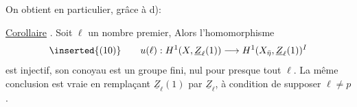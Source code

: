 On obtient en particulier\unsure{*}, grâce à d): 

\uline{Corollaire} .  Soit $\ell$ un nombre premier,  Alors l'homomorphisme
\[
\inserted{(10)}\qquad u(\ell):H^1(X,\underline Z_\ell(1))\longrightarrow H^1(X_{\bar\eta},\underline Z_\ell(1))^I
\]
est injectif, son conoyau est un groupe fini, nul pour presque tout $\ell$.
La même conclusion est vraie en remplaçant $\underline Z_\ell(1)$ par $\underline Z_\ell$, à condition de supposer $\ell\neq p$.

\margin{$\times$}
